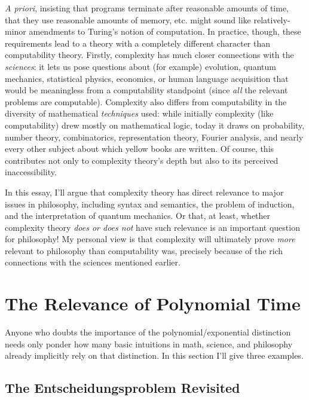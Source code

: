 \documentclass[12pt,onecolumn]{article}%
\begin{document}
\textit{A priori}, insisting that programs terminate after reasonable amounts
of time, that they use reasonable amounts of memory, etc. might sound like
relatively-minor amendments to Turing's notion of computation. In practice,
though, these requirements lead to a theory with a completely different
character than computability theory. Firstly, complexity has much closer
connections with the \textit{sciences}: it lets us pose questions about (for
example) evolution, quantum mechanics, statistical physics, economics, or
human language acquisition that would be meaningless from a computability
standpoint (since \textit{all} the relevant problems are computable).
 Complexity also differs from computability in the diversity of mathematical
\textit{techniques} used: while initially complexity (like computability) drew
mostly on mathematical logic, today it draws on probability, number theory,
combinatorics, representation theory, Fourier analysis, and nearly every other
subject about which yellow books are written. Of course, this contributes
not only to complexity theory's depth but also to its perceived inaccessibility.

In this essay, I'll argue that complexity theory has direct relevance to major
issues in philosophy, including syntax and semantics, the problem of
induction, and the interpretation of quantum mechanics. Or that, at least,
whether complexity theory \textit{does or does not} have such relevance is an
important question for philosophy! My personal view is that complexity will
ultimately prove \textit{more} relevant to philosophy than computability was,
precisely because of the rich connections with the sciences mentioned earlier.

\section{The Relevance of Polynomial Time\label{CTP}}

Anyone who doubts the importance of the polynomial/exponential
distinction needs only ponder how many basic intuitions in math, science, and
philosophy already implicitly rely on that distinction. In this section I'll
give three examples.

\subsection{The Entscheidungsproblem Revisited\label{ENTSCH}}
\end{document}
